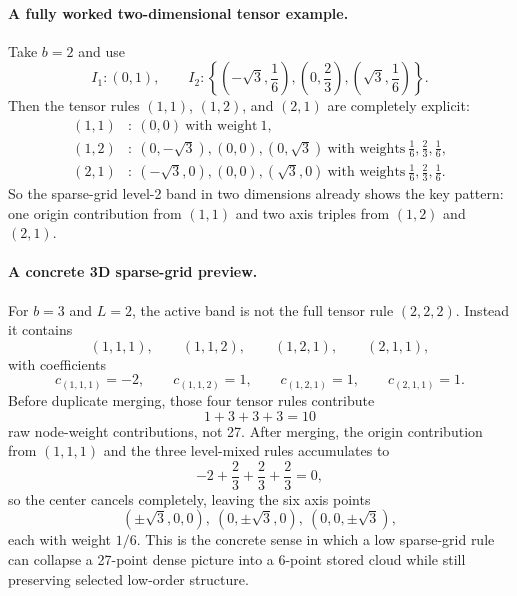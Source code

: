 \paragraph{A fully worked two-dimensional tensor example.}
Take \(b=2\) and use
\begin{equation}
  I_1:(0,1),
  \qquad
  I_2:\left\{\left(-\sqrt3,\frac16\right),\left(0,\frac23\right),
  \left(\sqrt3,\frac16\right)\right\}.
  \label{eq:bf-hd-sgqf-2d-rules}
\end{equation}
Then the tensor rules \((1,1)\), \((1,2)\), and \((2,1)\) are completely
explicit:
\begin{align}
  (1,1)&:\ (0,0)\ \text{with weight}\ 1,
  \label{eq:bf-hd-sgqf-rule-11}\\
  (1,2)&:\ (0,-\sqrt3),(0,0),(0,\sqrt3)
  \ \text{with weights}\ \frac16,\frac23,\frac16,
  \label{eq:bf-hd-sgqf-rule-12}\\
  (2,1)&:\ (-\sqrt3,0),(0,0),(\sqrt3,0)
  \ \text{with weights}\ \frac16,\frac23,\frac16.
  \label{eq:bf-hd-sgqf-rule-21}
\end{align}
So the sparse-grid level-2 band in two dimensions already shows the key pattern:
one origin contribution from \((1,1)\) and two axis triples from \((1,2)\) and
\((2,1)\).

\paragraph{A concrete 3D sparse-grid preview.}
For \(b=3\) and \(L=2\), the active band is not the full tensor rule \((2,2,2)\).
Instead it contains
\begin{equation}
  (1,1,1),
  \qquad
  (1,1,2),
  \qquad
  (1,2,1),
  \qquad
  (2,1,1),
  \label{eq:bf-hd-sgqf-3d-active-indices}
\end{equation}
with coefficients
\begin{equation}
  c_{(1,1,1)}=-2,
  \qquad
  c_{(1,1,2)}=1,
  \qquad
  c_{(1,2,1)}=1,
  \qquad
  c_{(2,1,1)}=1.
  \label{eq:bf-hd-sgqf-3d-coefficients}
\end{equation}
Before duplicate merging, those four tensor rules contribute
\begin{equation}
  1+3+3+3=10
  \label{eq:bf-hd-sgqf-3d-raw-count}
\end{equation}
raw node-weight contributions, not 27.  After merging, the origin contribution
from \((1,1,1)\) and the three level-mixed rules accumulates to
\begin{equation}
  -2+\frac23+\frac23+\frac23=0,
  \label{eq:bf-hd-sgqf-3d-origin-cancel}
\end{equation}
so the center cancels completely, leaving the six axis points
\begin{equation}
  (\pm\sqrt3,0,0),\ (0,\pm\sqrt3,0),\ (0,0,\pm\sqrt3),
  \label{eq:bf-hd-sgqf-3d-axis-cloud}
\end{equation}
each with weight \(1/6\).  This is the concrete sense in which a low sparse-grid
rule can collapse a 27-point dense picture into a 6-point stored cloud while
still preserving selected low-order structure.

